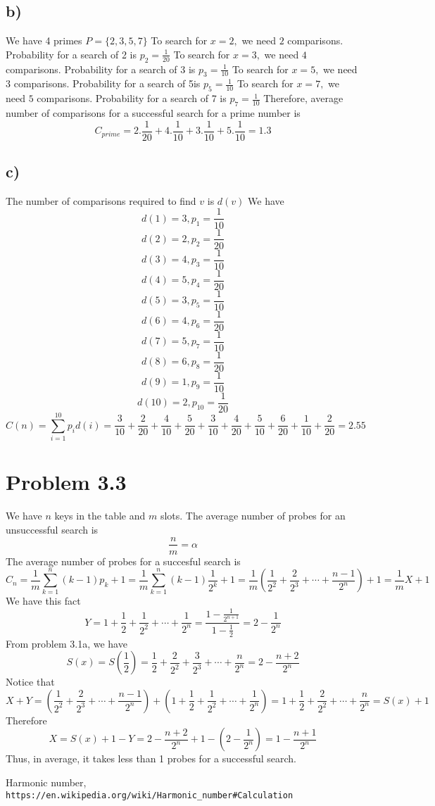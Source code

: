 \documentclass[a4paper,12pt]{report}
\begin{document}
\subsection*{b)}
We have 4 primes \(P=\{2,3,5,7\}\)
\newline
To search for \(x=2,\) we need \(2\) comparisons. Probability for a search of 2 is \(p_2=\frac{1}{20}\)
\newline
To search for \(x=3,\) we need \(4\) comparisons. Probability for a search of 3 is \(p_3=\frac{1}{10}\)
\newline
To search for \(x=5,\) we need \(3\) comparisons. Probability for a search of 5is \(p_5=\frac{1}{10}\)
\newline
To search for \(x=7,\) we need \(5\) comparisons. Probability for a search of 7 is \(p_7=\frac{1}{10}\)
\newline
Therefore, average number of comparisons for a successful search for a prime number is
\[C_{prime}=2.\frac{1}{20}+4.\frac{1}{10}+3.\frac{1}{10}+5.\frac{1}{10}=1.3\]
\subsection*{c)}
The number of comparisons required to find \(v\) is \(d(v)\)
\newline
We have 
\[d(1)=3,p_1=\frac{1}{10}\]
\[d(2)=2,p_2=\frac{1}{20}\]
\[d(3)=4,p_3=\frac{1}{10}\]
\[d(4)=5,p_4=\frac{1}{20}\]
\[d(5)=3,p_5=\frac{1}{10}\]
\[d(6)=4,p_6=\frac{1}{20}\]
\[d(7)=5,p_7=\frac{1}{10}\]
\[d(8)=6,p_8=\frac{1}{20}\]
\[d(9)=1,p_9=\frac{1}{10}\]
\[d(10)=2,p_{10}=\frac{1}{20}\]
\[C(n)=\sum_{i=1}^{10} p_id(i)=\frac{3}{10}+\frac{2}{20}+\frac{4}{10}+\frac{5}{20}+\frac{3}{10}+\frac{4}{20}+\frac{5}{10}+\frac{6}{20}+\frac{1}{10}+\frac{2}{20}=2.55\]
\section*{Problem 3.3}
We have \(n\) keys in the table and \(m\) slots.
\newline
The average number of probes for an unsuccessful search is
\[\frac{n}{m}=\alpha\]
The average number of probes for a succesful search is
\[C_n=\frac{1}{m}\sum_{k=1}^n (k-1)p_k +1=\frac{1}{m}\sum_{k=1}^n (k-1)\frac{1}{2^k} +1=\frac{1}{m}(\frac{1}{2^2}+\frac{2}{2^3}+\cdots+\frac{n-1}{2^n})+1=\frac{1}{m}X+1\]
We have this fact
\[Y=1+\frac{1}{2}+\frac{1}{2^2}+\cdots+\frac{1}{2^n}=\frac{1-\frac{1}{2^{n+1}}}{1-\frac{1}{2}}=2-\frac{1}{2^n}\]
From problem 3.1a, we have 
\[S(x)=S(\frac{1}{2})=\frac{1}{2}+\frac{2}{2^2}+\frac{3}{2^3}+\cdots+\frac{n}{2^n}=2-\frac{n+2}{2^n}\]
Notice that
\[X+Y=(\frac{1}{2^2}+\frac{2}{2^3}+\cdots+\frac{n-1}{2^n})+(1+\frac{1}{2}+\frac{1}{2^2}+\cdots+\frac{1}{2^n})=1+\frac{1}{2}+\frac{2}{2^2}+\cdots+\frac{n}{2^n}=S(x)+1\]
Therefore
\[X=S(x)+1-Y=2-\frac{n+2}{2^n}+1-(2-\frac{1}{2^n})=1-\frac{n+1}{2^n}\]
Thus, in average, it takes less than 1 probes for a successful search.

\begin{thebibliography}{9}
Harmonic number,
\\\texttt{https://en.wikipedia.org/wiki/Harmonic\_{}number\#{}Calculation}
\end{thebibliography}
\end{document}
